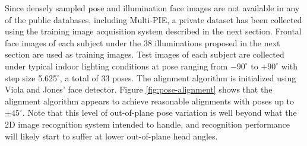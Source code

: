  Since densely sampled pose and
    illumination face images are not available in any of
    the public databases, including Multi-PIE, a private
	dataset has been collected using the training image
	acquisition system described in the next section.
	Frontal face images of each subject under the 38 illuminations proposed
    in the next section are used as training images. Test
	images of each subject are collected under typical indoor
    lighting conditions at pose ranging from $-90^\circ$ to
    $+90^\circ$ with step size 5.625$^\circ$, a total of 33
    poses. The alignment algorithm is initialized using 
	Viola and Jones' face detector.
	Figure \ref{fig:pose-alignment} shows that the alignment algorithm 
	appears to achieve reasonable alignments
	with poses up to $\pm 45^\circ$.
Note that this level of out-of-plane
 pose variation is well beyond what the 2D image recognition system
intended to handle, and recognition performance will likely start
to suffer at lower out-of-plane head angles.
